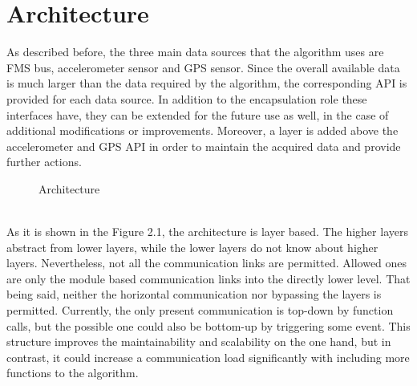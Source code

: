 \section{Architecture}

As described before, the three main data sources that the algorithm uses are FMS bus, accelerometer sensor and GPS sensor. Since the overall available data is much larger than the data required by the algorithm, the corresponding API is provided for each data source. In addition to the encapsulation role these interfaces have, they can be extended for the future use as well, in the case of additional modifications or improvements. Moreover, a layer is added above the accelerometer and GPS API in order to maintain the acquired data and provide further actions.
\begin{figure}[!htb]
	\caption{Architecture}
\end{figure}
\\
As it is shown in the Figure 2.1, the architecture is layer based. The higher layers abstract from lower layers, while the lower layers do not know about higher layers. Nevertheless, not all the communication links are permitted. Allowed ones are only the module based communication links into the directly lower level. That being said, neither the horizontal communication nor bypassing the layers is permitted. Currently, the only present communication is top-down by function calls, but the possible one could also be bottom-up by triggering some event. This structure improves the maintainability and scalability on the one hand, but in contrast, it could increase a communication load significantly with including more functions to the algorithm. 
\clearpage

